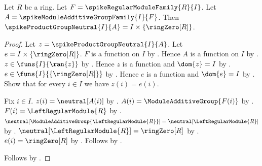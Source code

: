 \begin{proposition}\label{spike_free_module_zero_section}
    Let $R$ be a ring.
    Let $F=\spikeRegularModuleFamily{R}{I}$.
    Let $A=\spikeModuleAdditiveGroupFamily{I}{F}$.
    Then
        $\spikeProductGroupNeutral{I}{A}
            =I\times\{\ringZero[R]\}$.
\end{proposition}
\begin{proof}
    Let $z=\spikeProductGroupNeutral{I}{A}$.
    Let $e=I\times\{\ringZero[R]\}$.
    $F$ is a function on $I$ by
        .
    Hence $A$ is a function on $I$ by
        .
    $z\in\funs{I}{\ran{z}}$ by
        .
    Hence $z$ is a function and $\dom{z}=I$ by
        .
    $e\in\funs{I}{\{\ringZero[R]\}}$ by
        .
    Hence $e$ is a function and $\dom{e}=I$ by
        .
    Show that for every $i\in I$ we have $z(i)=e(i)$.
    \begin{subproof}
        Fix $i\in I$.
        $z(i)=\neutral[A(i)]$ by
            .
        $A(i)=\ModuleAdditiveGroup{F(i)}$ by
            .
        $F(i)=\LeftRegularModule{R}$ by
            .
        $\neutral[\ModuleAdditiveGroup{\LeftRegularModule{R}}]
            =\neutral[\LeftRegularModule{R}]$ by
            .
        $\neutral[\LeftRegularModule{R}]=\ringZero[R]$ by
            .
        $e(i)=\ringZero[R]$ by .
        Follows by \auto.
    \end{subproof}
    Follows by .
\end{proof}

